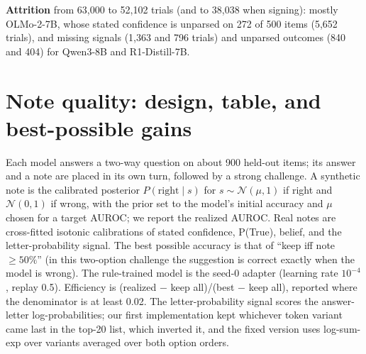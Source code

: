 \documentclass{article} %
\begin{document}
\textbf{Attrition} from 63{,}000 to 52{,}102 trials (and to 38{,}038 when signing): mostly OLMo-2-7B, whose stated confidence is unparsed on 272 of 500 items (5{,}652 trials), and missing signals (1{,}363 and 796 trials) and unparsed outcomes (840 and 404) for Qwen3-8B and R1-Distill-7B.

\section{Note quality: design, table, and best-possible gains}
\label{app:curve}

Each model answers a two-way question on about 900 held-out items; its answer and a note are placed in its own turn, followed by a strong challenge. A synthetic note is the calibrated posterior $P(\text{right}\mid s)$ for $s\sim\mathcal N(\mu,1)$ if right and $\mathcal N(0,1)$ if wrong, with the prior set to the model's initial accuracy and $\mu$ chosen for a target AUROC; we report the realized AUROC. Real notes are cross-fitted isotonic calibrations of stated confidence, P(True), belief, and the letter-probability signal. The best possible accuracy is that of ``keep iff note $\ge50\%$'' (in this two-option challenge the suggestion is correct exactly when the model is wrong). The rule-trained model is the seed-0 adapter (learning rate $10^{-4}$, replay 0.5). Efficiency is (realized $-$ keep all)/(best $-$ keep all), reported where the denominator is at least 0.02. The letter-probability signal scores the answer-letter log-probabilities; our first implementation kept whichever token variant came last in the top-20 list, which inverted it, and the fixed version uses log-sum-exp over variants averaged over both option orders.
\end{document}
